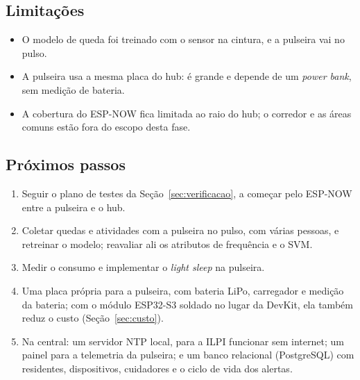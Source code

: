 \subsection{Limitações}

\begin{itemize}
  \item O modelo de queda foi treinado com o sensor na cintura, e a pulseira vai no pulso.
  \item A pulseira usa a mesma placa do hub: é grande e depende de um \textit{power bank}, sem
        medição de bateria.
  \item A cobertura do ESP-NOW fica limitada ao raio do hub; o corredor e as áreas comuns
        estão fora do escopo desta fase.
\end{itemize}

\subsection{Próximos passos}

\begin{enumerate}
  \item Seguir o plano de testes da Seção~\ref{sec:verificacao}, a começar pelo ESP-NOW entre a
        pulseira e o hub.
  \item Coletar quedas e atividades com a pulseira no pulso, com várias pessoas, e retreinar
        o modelo; reavaliar ali os atributos de frequência e o SVM.
  \item Medir o consumo e implementar o \textit{light sleep} na pulseira.
  \item Uma placa própria para a pulseira, com bateria LiPo, carregador e medição da bateria; com
        o módulo ESP32-S3 soldado no lugar da DevKit, ela também reduz o custo
        (Seção~\ref{sec:custo}).
  \item Na central: um servidor NTP local, para a ILPI funcionar sem internet; um painel para
        a telemetria da pulseira; e um banco relacional (PostgreSQL) com residentes,
        dispositivos, cuidadores e o ciclo de vida dos alertas.
\end{enumerate}
